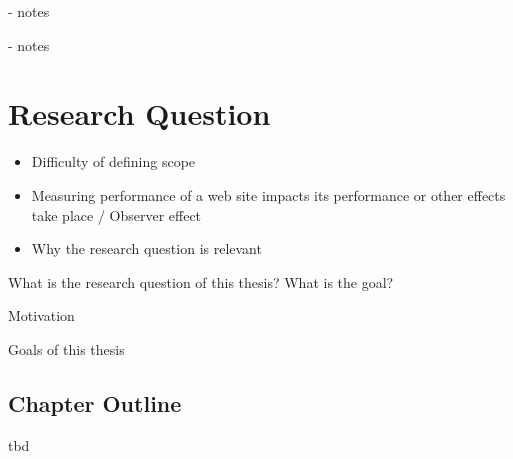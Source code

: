 - notes





- notes








\section{Research Question}

\begin{itemize}
\item Difficulty of defining scope
\item Measuring performance of a web site impacts its performance or other effects take place / Observer effect
\item Why the research question is relevant
\end{itemize}

What is the research question of this thesis?
What is the goal?







Motivation


Goals of this thesis


\subsection{Chapter Outline}

tbd



















